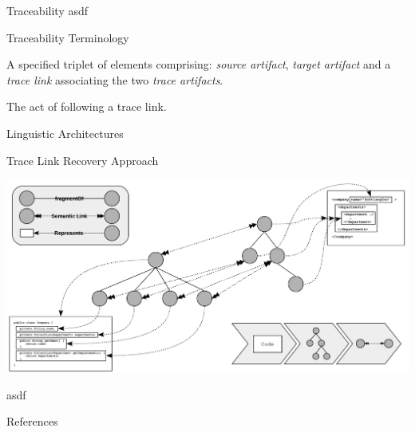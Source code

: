 \documentclass{beamer}
\begin{document}
\begin{frame}{Traceability}
asdf
\end{frame}

\begin{frame}{Traceability Terminology}
\begin{definition}[Trace]
\begin{description}[align=left]
\item[(Noun)]
A specified triplet of elements comprising: \emph{source artifact}, \emph{target artifact} and a \emph{trace link} associating the two \emph{trace artifacts}. \cite{DBLP:books/daglib/p/GotelCHZEGDAMM12}
\item[(Verb)]
The act of following a trace link. \cite{DBLP:books/daglib/p/GotelCHZEGDAMM12}
\end{description}
\end{definition}

\end{frame}

\begin{frame}{Linguistic Architectures}
\end{frame}

\begin{frame}{Trace Link Recovery Approach}
\begin{center}
\includegraphics[width=\textwidth]{RecoveryApproach.png}
\end{center}
\pagebreak
asdf
\end{frame}



\begin{frame}{References}

{}
\end{frame}
\end{document}
